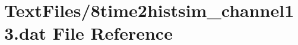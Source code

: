 \hypertarget{8time2histsim__channel13_8dat}{}\section{Text\+Files/8time2histsim\+\_\+channel13.dat File Reference}
\label{8time2histsim__channel13_8dat}
